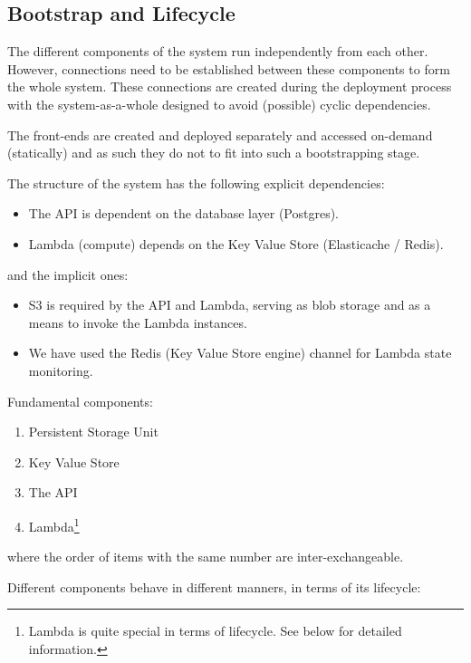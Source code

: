 
\subsection{Bootstrap and Lifecycle}

The different components of the system run independently from each other. However, connections need to be established between these components to form the whole system. These connections are created during the deployment process with the system-as-a-whole designed to avoid (possible) cyclic dependencies.

The front-ends are created and deployed separately and accessed on-demand (statically) and as such they do not to fit into such a bootstrapping stage.

The structure of the system has the following explicit dependencies:

\begin{itemize}
	\item The API is dependent on the database layer (Postgres).
	\item Lambda (compute) depends on the Key Value Store (Elasticache / Redis).
\end{itemize}

and the implicit ones:

\begin{itemize}
	\item S3 is required by the API and Lambda, serving as blob storage and as a means to invoke the Lambda instances.
	\item We have used the Redis (Key Value Store engine) channel for Lambda state monitoring.
\end{itemize}

Fundamental components:

\begin{enumerate}
	\item[1] Persistent Storage Unit
	\item[1] Key Value Store
	\item[2] The API
	\item[3] Lambda\footnote{Lambda is quite special in terms of lifecycle. See below for detailed information.}
\end{enumerate}

where the order of items with the same number are inter-exchangeable.

Different components behave in different manners, in terms of its lifecycle:

